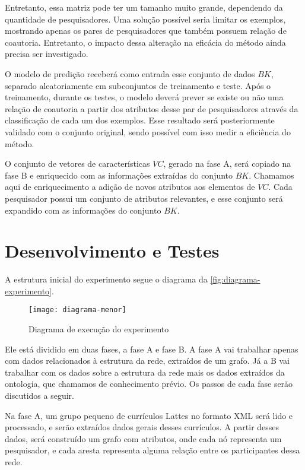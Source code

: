 Entretanto, essa matriz pode ter um tamanho muito grande, dependendo da quantidade de pesquisadores. Uma solução possível seria limitar os exemplos, mostrando apenas os pares de pesquisadores que também possuem relação de coautoria. Entretanto, o impacto dessa alteração na eficácia do método ainda precisa ser investigado.

O modelo de predição receberá como entrada esse conjunto de dados $BK$, separado aleatoriamente em subconjuntos de treinamento e teste. Após o treinamento, durante os testes, o modelo deverá prever se existe ou não uma relação de coautoria a partir dos atributos desse par de pesquisadores através da classificação de cada um dos exemplos. Esse resultado será posteriormente validado com o conjunto original, sendo possível com isso medir a eficiência do método.

O conjunto de vetores de características $VC$, gerado na fase A, será copiado na fase B e enriquecido com as informações extraídas do conjunto $BK$. Chamamos aqui de enriquecimento a adição de novos atributos aos elementos de $VC$. Cada pesquisador possui um conjunto de atributos relevantes, e esse conjunto será expandido com as informações do conjunto $BK$.

\section{Desenvolvimento e Testes}
\label{sec:desenvolvimento-testes}

A estrutura inicial do experimento segue o diagrama da \autoref{fig:diagrama-experimento}.

\begin{figure}[!h]
  \centering
  \texttt{[image: diagrama-menor]}
  \caption{Diagrama de execução do experimento}
  \label{fig:diagrama-experimento}
\end{figure}

Ele está dividido em duas fases, a fase A e fase B. A fase A vai trabalhar apenas com dados relacionados à estrutura da rede, extraídos de um grafo. Já a B vai trabalhar com os dados sobre a estrutura da rede mais os dados extraídos da ontologia, que chamamos de conhecimento prévio. Os passos de cada fase serão discutidos a seguir.

Na fase A, um grupo pequeno de currículos Lattes no formato XML será lido e processado, e serão extraídos dados gerais desses currículos. A partir desses dados, será construído um grafo com atributos, onde cada nó representa um pesquisador, e cada aresta representa alguma relação entre os participantes dessa rede.

